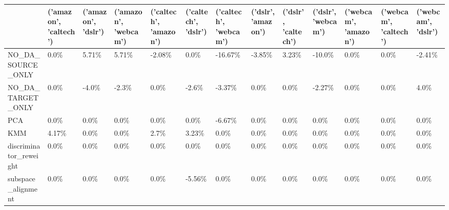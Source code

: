 \begin{tabular}{lllllllllllll}
\hline
                              & ('amazon', 'caltech')   & ('amazon', 'dslr')   & ('amazon', 'webcam')   & ('caltech', 'amazon')   & ('caltech', 'dslr')   & ('caltech', 'webcam')   & ('dslr', 'amazon')   & ('dslr', 'caltech')   & ('dslr', 'webcam')   & ('webcam', 'amazon')   & ('webcam', 'caltech')   & ('webcam', 'dslr')   \\
\hline
 NO\_DA\_SOURCE\_ONLY            & 0.0\%                    & 5.71\%                & 5.71\%                  & -2.08\%                  & 0.0\%                  & -16.67\%                 & -3.85\%               & 3.23\%                 & -10.0\%               & 0.0\%                   & 0.0\%                    & -2.41\%               \\
 NO\_DA\_TARGET\_ONLY            & 0.0\%                    & -4.0\%                & -2.3\%                  & 0.0\%                    & -2.6\%                 & -3.37\%                  & 0.0\%                 & 0.0\%                  & -2.27\%               & 0.0\%                   & 0.0\%                    & 4.0\%                 \\
 PCA                          & 0.0\%                    & 0.0\%                 & 0.0\%                   & 0.0\%                    & 0.0\%                  & -6.67\%                  & 0.0\%                 & 0.0\%                  & 0.0\%                 & 0.0\%                   & 0.0\%                    & 0.0\%                 \\
 KMM                          & 4.17\%                   & 0.0\%                 & 0.0\%                   & 2.7\%                    & 3.23\%                 & 0.0\%                    & 0.0\%                 & 0.0\%                  & 0.0\%                 & 0.0\%                   & 0.0\%                    & 0.0\%                 \\
 discriminator\_reweight       & 0.0\%                    & 0.0\%                 & 0.0\%                   & 0.0\%                    & 0.0\%                  & 0.0\%                    & 0.0\%                 & 0.0\%                  & 0.0\%                 & 0.0\%                   & 0.0\%                    & 0.0\%                 \\
 subspace\_alignment           & 0.0\%                    & 0.0\%                 & 0.0\%                   & 0.0\%                    & -5.56\%                & 0.0\%                    & 0.0\%                 & 0.0\%                  & 0.0\%                 & 0.0\%                   & 0.0\%                    & 0.0\%                 \\

\end{tabular}
